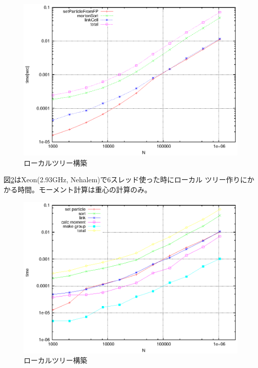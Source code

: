 \begin{figure}[h]
  \begin{center}
    \includegraphics[width=15cm]{fig/timeingLT.eps}
  \end{center}
  \caption{ローカルツリー構築}
  \label{fig:makeLT}
\end{figure}

\newpage

図\ref{fig:makeLT}はXeon(2.93GHz, Nehalem)で6スレッド使った時にローカル
ツリー作りにかかる時間。モーメント計算は重心の計算のみ。

\begin{figure}[h]
  \begin{center}
    \includegraphics[width=15cm]{fig/timeingLT_xeon.eps}
  \end{center}
  \caption{ローカルツリー構築}
  \label{fig:makeLT}
\end{figure}

